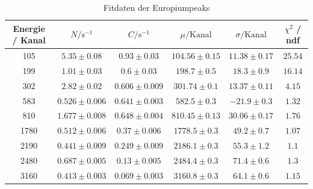 \documentclass[12pt,listof=totoc]{scrartcl}
\begin{document}
\begin{table}[h!]
	\footnotesize\centering
	\begin{tabular}{|c||c|c|c|c||c|}
		\hline
		Energie / Kanal&$N/\mathrm{s^{-1}}$&$C/\mathrm{s^{-1}}$&$\mu/\mathrm{Kanal}$&$\sigma/\mathrm{Kanal}$&$\chi^2$ / ndf\\\hline\hline105&$5.35\pm0.08$&$0.93\pm0.03$&$104.56\pm0.15$&$11.38\pm0.17$&$25.54$\\
		199&$1.01\pm0.03$&$0.6\pm0.03$&$198.7\pm0.5$&$18.3\pm0.9$&$16.14$\\
		302&$2.82\pm0.02$&$0.606\pm0.009$&$301.74\pm0.1$&$13.37\pm0.11$&$4.15$\\
		583&$0.526\pm0.006$&$0.641\pm0.003$&$582.5\pm0.3$&$-21.9\pm0.3$&$1.32$\\
		810&$1.677\pm0.008$&$0.648\pm0.004$&$810.45\pm0.13$&$30.06\pm0.17$&$1.76$\\
		1780&$0.512\pm0.006$&$0.37\pm0.006$&$1778.5\pm0.3$&$49.2\pm0.7$&$1.07$\\
		2190&$0.441\pm0.009$&$0.249\pm0.009$&$2186.1\pm0.3$&$55.3\pm1.2$&$1.1$\\
		2480&$0.687\pm0.005$&$0.13\pm0.005$&$2484.4\pm0.3$&$71.4\pm0.6$&$1.3$\\
		3160&$0.413\pm0.003$&$0.069\pm0.003$&$3160.8\pm0.3$&$64.1\pm0.6$&$1.15$\\
		\hline\end{tabular}
	\caption{Fitdaten der Europiumpeaks\label{europiumtable}}
\end{table}
\end{document}
